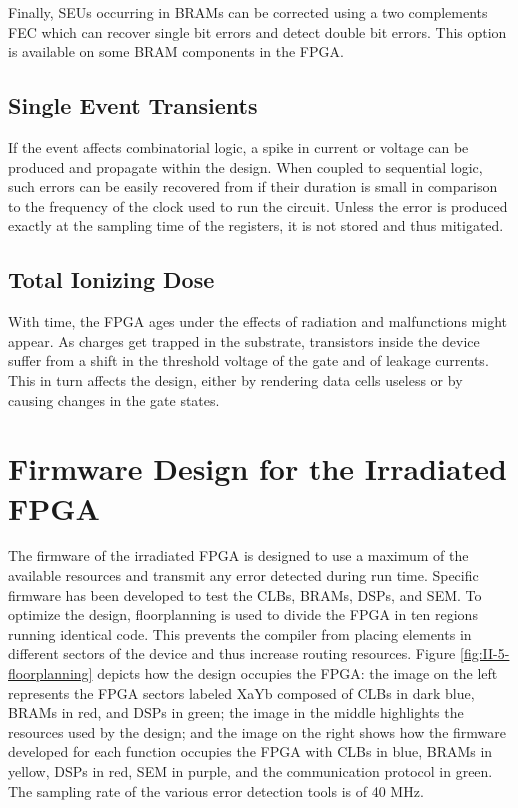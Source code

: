      Finally, SEUs occurring in BRAMs can be corrected using a two complements FEC which can recover single bit errors and detect double bit errors. This option is available on some BRAM components in the FPGA.

    \subsection{Single Event Transients}

      If the event affects combinatorial logic, a spike in current or voltage can be produced and propagate within the design. When coupled to sequential logic, such errors can be easily recovered from if their duration is small in comparison to the frequency of the clock used to run the circuit. Unless the error is produced exactly at the sampling time of the registers, it is not stored and thus mitigated.

    \subsection{Total Ionizing Dose}

      With time, the FPGA ages under the effects of radiation and malfunctions might appear. As charges get trapped in the substrate, transistors inside the device suffer from a shift in the threshold voltage of the gate and of leakage currents. This in turn affects the design, either by rendering data cells useless or by causing changes in the gate states.

  \section{Firmware Design for the Irradiated FPGA}

    The firmware of the irradiated FPGA is designed to use a maximum of the available resources and transmit any error detected during run time. Specific firmware has been developed to test the CLBs, BRAMs, DSPs, and SEM. To optimize the design, floorplanning is used to divide the FPGA in ten regions running identical code. This prevents the compiler from placing elements in different sectors of the device and thus increase routing resources. Figure \ref{fig:II-5-floorplanning} depicts how the design occupies the FPGA: the image on the left represents the FPGA sectors labeled XaYb composed of CLBs in dark blue, BRAMs in red, and DSPs in green; the image in the middle highlights the resources used by the design; and the image on the right shows how the firmware developed for each function occupies the FPGA with CLBs in blue, BRAMs in yellow, DSPs in red, SEM in purple, and the communication protocol in green. The sampling rate of the various error detection tools is of 40 MHz.

